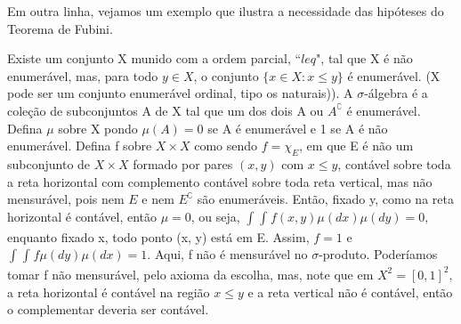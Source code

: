 \documentclass[MeasureTheory/measure_theory.tex]{subfiles}
\begin{document}
Em outra linha, vejamos um exemplo que ilustra a necessidade das hipóteses do Teorema de Fubini.
\begin{example}
	Existe um conjunto X munido com a ordem parcial, ``\(leq \)", tal que X é não enumerável, mas, para todo \(y\in X\), o conjunto \(\{x\in X: x \leq y\}\) é enumerável. (X pode ser um conjunto enumerável ordinal, tipo os naturais)).
	A \(\sigma \)-álgebra é a coleção de subconjuntos A de X tal que um dos dois A ou \(A ^{\complement}\) é enumerável. Defina \(\mu \) sobre X pondo \(\mu (A) = 0\) se A é enumerável e 1 se A é não enumerável. Defina f sobre \(X\times X\) como sendo
	\(f = \chi_{E}\), em que E é não um subconjunto de \(X\times X\) formado por pares \((x, y)\) com \(x\leq y\), contável sobre toda a reta horizontal com complemento contável sobre toda reta vertical, mas não mensurável, pois nem \(E \) e nem \(E ^{\complement}\) são enumeráveis.
	Então, fixado y, como na reta horizontal é contável, então \(\mu = 0\), ou seja, \(\int_{}^{}\int_{}^{}f(x, y)\mu (dx)\mu (dy) = 0, \) enquanto fixado x, todo ponto (x, y) está em E. Assim, \(f=1\) e \(\int_{}^{}\int_{}^{}f\mu (dy)\mu (dx) = 1.\)
	Aqui, f não é mensurável no \(\sigma \)-produto. Poderíamos tomar f não mensurável, pelo axioma da escolha, mas, note que em \(X^{2} = [0, 1]^{2},\) a reta horizontal é contável na região \(x\leq y\) e a reta vertical não é contável, então o complementar deveria ser contável.
\end{example}
\end{document}
